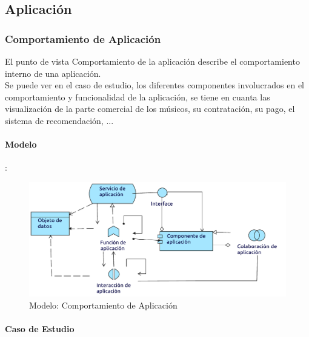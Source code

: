 \subsection{Aplicación}

\subsubsection{Comportamiento de Aplicación}
El punto de vista Comportamiento de la aplicación describe el comportamiento interno de una aplicación.\\

Se puede ver en el caso de estudio, los diferentes componentes involucrados en el comportamiento y funcionalidad de la aplicación, se tiene en cuanta las visualización de la parte comercial de los músicos, su contratación, su pago, el sistema de recomendación, ...

\paragraph{Modelo}:
\begin{figure}[h!]
	\centering
	\includegraphics[width=0.8\linewidth]{Desarrollo/ArquitecturaEmpresarial/Aplicacion/imgs/ComportamientoMetamodelo.pdf}
	\caption{Modelo: Comportamiento de Aplicación}
\end{figure}

\newpage

\paragraph{Caso de Estudio}

